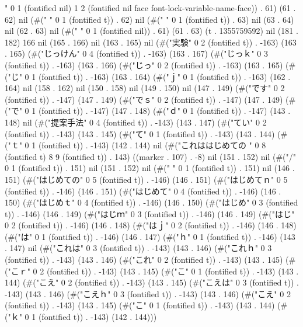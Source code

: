 " 0 1 (fontified nil) 1 2 (fontified nil face font-lock-variable-name-face)) . 61) (61 . 62) nil (#(" " 0 1 (fontified t)) . 62) nil (#(" " 0 1 (fontified t)) . 63) nil (63 . 64) nil (62 . 63) nil (#(" " 0 1 (fontified nil)) . 61) (61 . 63) (t . 1355759592) nil (181 . 182) 166 nil (165 . 166) nil (163 . 165) nil (#("実験" 0 2 (fontified t)) . -163) (163 . 165) (#("じっけん" 0 4 (fontified t)) . -163) (163 . 167) (#("じっｋ" 0 3 (fontified t)) . -163) (163 . 166) (#("じっ" 0 2 (fontified t)) . -163) (163 . 165) (#("じ" 0 1 (fontified t)) . -163) (163 . 164) (#("ｊ" 0 1 (fontified t)) . -163) (162 . 164) nil (158 . 162) nil (150 . 158) nil (149 . 150) nil (147 . 149) (#("です" 0 2 (fontified t)) . -147) (147 . 149) (#("でｓ" 0 2 (fontified t)) . -147) (147 . 149) (#("で" 0 1 (fontified t)) . -147) (147 . 148) (#("ｄ" 0 1 (fontified t)) . -147) (143 . 148) nil (#("提案手法" 0 4 (fontified t)) . -143) (143 . 147) (#("てい" 0 2 (fontified t)) . -143) (143 . 145) (#("て" 0 1 (fontified t)) . -143) (143 . 144) (#("ｔ" 0 1 (fontified t)) . -143) (142 . 144) nil (#("これははじめての
" 0 8 (fontified t) 8 9 (fontified t)) . 143) ((marker . 107) . -8) nil (151 . 152) nil (#("/" 0 1 (fontified t)) . 151) nil (151 . 152) nil (#("
" 0 1 (fontified t)) . 151) nil (146 . 151) (#("はじめての" 0 5 (fontified t)) . -146) (146 . 151) (#("はじめてｎ" 0 5 (fontified t)) . -146) (146 . 151) (#("はじめて" 0 4 (fontified t)) . -146) (146 . 150) (#("はじめｔ" 0 4 (fontified t)) . -146) (146 . 150) (#("はじめ" 0 3 (fontified t)) . -146) (146 . 149) (#("はじｍ" 0 3 (fontified t)) . -146) (146 . 149) (#("はじ" 0 2 (fontified t)) . -146) (146 . 148) (#("はｊ" 0 2 (fontified t)) . -146) (146 . 148) (#("は" 0 1 (fontified t)) . -146) (146 . 147) (#("ｈ" 0 1 (fontified t)) . -146) (143 . 147) nil (#("これは" 0 3 (fontified t)) . -143) (143 . 146) (#("これｈ" 0 3 (fontified t)) . -143) (143 . 146) (#("これ" 0 2 (fontified t)) . -143) (143 . 145) (#("こｒ" 0 2 (fontified t)) . -143) (143 . 145) (#("こ" 0 1 (fontified t)) . -143) (143 . 144) (#("こえ" 0 2 (fontified t)) . -143) (143 . 145) (#("こえは" 0 3 (fontified t)) . -143) (143 . 146) (#("こえｈ" 0 3 (fontified t)) . -143) (143 . 146) (#("こえ" 0 2 (fontified t)) . -143) (143 . 145) (#("こ" 0 1 (fontified t)) . -143) (143 . 144) (#("ｋ" 0 1 (fontified t)) . -143) (142 . 144)))
